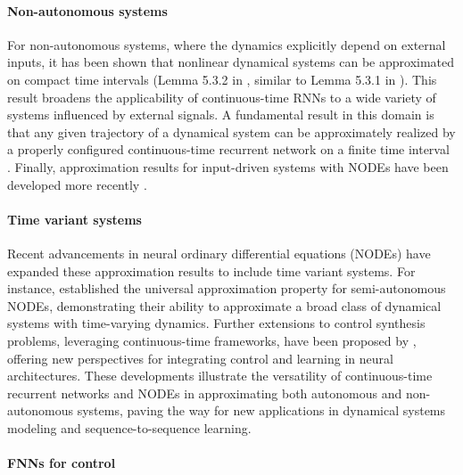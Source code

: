 \documentclass{article}
\theoremstyle{definition}
\theoremstyle{remark}
\newcounter{ct}
\begin{document}
\paragraph{Non-autonomous systems}
For non-autonomous systems, where the dynamics explicitly depend on external inputs, it has been shown that nonlinear dynamical systems can be approximated on compact time intervals (Lemma 5.3.2 in \citep{garces2012strategies}, similar to Lemma 5.3.1 in \citep{smale1974differential}).
This result broadens the applicability of continuous-time RNNs to a wide variety of systems influenced by external signals.
A fundamental result in this domain is that any given trajectory of a dynamical system can be approximately realized by a properly configured continuous-time recurrent network on a finite time interval \citep{nakamura2009approximation}.  %
Finally,  approximation results for input-driven systems with NODEs have been developed more recently \citep{ko2023homotopy}.
	
\paragraph{Time variant systems}
Recent advancements in neural ordinary differential equations (NODEs) have expanded these approximation results to include time variant systems. For instance, \citet{li2024universal} established the universal approximation property for semi-autonomous NODEs, demonstrating their ability to approximate a broad class of dynamical systems with time-varying dynamics. Further extensions to control synthesis problems, leveraging continuous-time frameworks, have been proposed by \citet{mei2024controlsynth}, offering new perspectives for integrating control and learning in neural architectures.
%
These developments illustrate the versatility of continuous-time recurrent networks and NODEs in approximating both autonomous and non-autonomous systems, paving the way for new applications in dynamical systems modeling and sequence-to-sequence learning.


\paragraph{FNNs for control}
\citep{psaltis1988multilayered} \citep{li1989control,chen1992adaptive}
\end{document}
